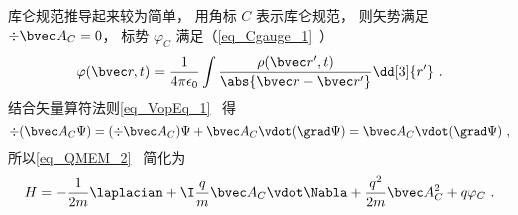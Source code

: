 
\begin{issues}
\issueDraft
\end{issues}


库仑规范推导起来较为简单， 用角标 $C$ 表示库仑规范， 则矢势满足 $\div \bvec A_C = 0$， 标势 $\varphi_C$ 满足（\autoref{eq_Cgauge_1}~）
\begin{equation}
\varphi(\bvec r, t) = \frac{1}{4\pi\epsilon_0} \int \frac{\rho(\bvec r', t)}{\abs{\bvec r - \bvec r'}} \dd[3]{r'}~.
\end{equation}
结合矢量算符法则\autoref{eq_VopEq_1}~ 得
\begin{equation}
\div (\bvec A_C \Psi) = (\div \bvec A_C) \Psi + \bvec A_C \vdot (\grad \Psi) = \bvec A_C \vdot (\grad \Psi)~,
\end{equation}
所以\autoref{eq_QMEM_2}~ 简化为
\begin{equation}\label{eq_CouGau_4}
H = -\frac{1}{2m} \laplacian + \I \frac{q}{m} \bvec A_C \vdot \Nabla + \frac{q^2}{2m} \bvec A_C^2 + q\varphi_C~.
\end{equation}
